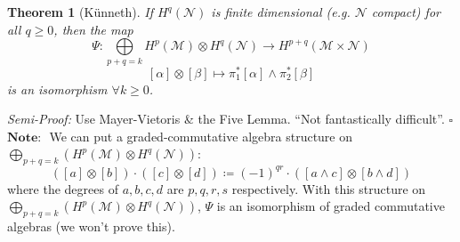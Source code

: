 \documentclass[10pt]{article}
\theoremstyle{plain}
\newtheorem{thm}{Theorem}[section] %
\theoremstyle{definition}
\newenvironment{semiproof}{\textit{Semi-Proof:}}{\hfill$\square$}
\newcommand{\Note}{\textbf{Note: }}
\newcommand{\man}{\mathcal{M}}
\newcommand{\nan}{\mathcal{N}}
\newcommand{\cohomman}[1]{H^{#1}(\man)}
\newcommand{\cohomnan}[1]{H^{#1}(\nan)}
\newcommand{\cohom}[2]{H^{#1}(#2)}
\newcommand{\mysection}[1]{
    \setcounter{thm}{0}
    \section*{#1}
    \addcontentsline{toc}{section}{#1}
    \addtocounter{section}{1}
    \setcounter{subsection}{0}

}
\begin{document}
\begin{thm}[K\"unneth]
If $\cohomnan{q}$ is finite dimensional (e.g. $\nan$ compact) for all $q \geq 0$, then the map
$$\Psi : \bigoplus\limits_{p+q = k} \cohomman{p} \otimes \cohomnan{q} \to \cohom{p+q}{\man \times \nan}$$
$$[\alpha] \otimes [\beta] \mapsto \pi_1^*[\alpha] \wedge \pi_2^* [\beta]$$ %
is an isomorphism $\forall k \geq 0$.
\end{thm}
\begin{semiproof}
Use Mayer-Vietoris \& the Five Lemma. ``Not fantastically difficult''.
\end{semiproof}\\
$\Note$ We can put a graded-commutative algebra structure on $\bigoplus\limits_{p+q=k}\left(\cohomman{p} \otimes \cohomnan{q}\right)$:
$$([a]\otimes[b]) \cdot ([c]\otimes[d]) \coloneqq (-1)^{qr} \cdot \left([a\wedge c]\otimes [b\wedge d]\right)$$
where the degrees of $a,b,c,d$ are $p,q,r,s$ respectively. With this structure on$\bigoplus\limits_{p+q=k}\left(\cohomman{p} \otimes \cohomnan{q}\right)$, $\Psi$ is an isomorphism of graded commutative algebras (we won't prove this).
\end{document}
